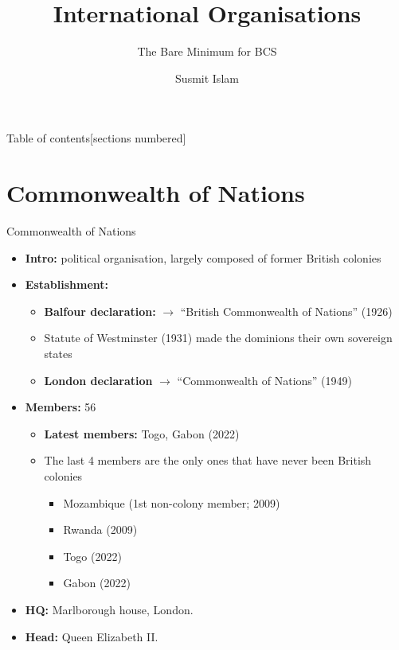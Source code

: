 \documentclass[
  10pt,
  ignorenonframetext,
  progressbar=frametitle]{beamer}
\title{International Organisations}
\subtitle{The Bare Minimum for BCS}
\author{Susmit Islam}
\date{}
\institute{Sir Salimullah Medical College}
\providecommand{\tightlist}{%
  \setlength{\itemsep}{0pt}\setlength{\parskip}{0pt}}
\begin{document}
\frame{\titlepage}
\begin{frame}{Table of contents}[sections numbered]

\tableofcontents[hideallsubsections]
\end{frame}

\section{Commonwealth of Nations}
\begin{frame}[allowframebreaks]
{Commonwealth of Nations}
\protect\hypertarget{commonwealth-of-nations}{}
\begin{itemize}
\tightlist
\item
  \textbf{Intro:} political organisation, largely composed of former
  British colonies
\item
  \textbf{Establishment:}

  \begin{itemize}
  \tightlist
  \item
    \textbf{Balfour declaration:} \(\rightarrow\) ``British Commonwealth
    of Nations'' (1926)
  \item
    Statute of Westminster (1931) made the dominions their own sovereign
    states
  \item
    \textbf{London declaration} \(\rightarrow\) ``Commonwealth of
    Nations'' (1949)
  \end{itemize}
\item
  \textbf{Members:} 56

  \begin{itemize}
  \tightlist
  \item
    \textbf{Latest members:} Togo, Gabon (2022)
  \item
    The last 4 members are the only ones that have never been British
    colonies

    \begin{itemize}
    \tightlist
    \item
      Mozambique (1st non-colony member; 2009)
    \item
      Rwanda (2009)
    \item
      Togo (2022)
    \item
      Gabon (2022)
    \end{itemize}
  \end{itemize}
\item
  \textbf{HQ:} Marlborough house, London.
\item
  \textbf{Head:} Queen Elizabeth II.
\end{itemize}
\end{frame}
\end{document}
